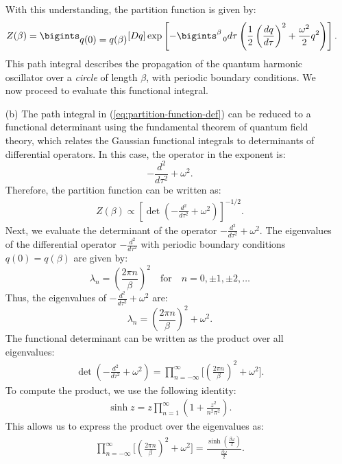\begin{enumerate}
    With this understanding, the partition function is given by:
    \begin{align}
        Z(\beta) = \bigints_{\displaystyle q(0) = q(\beta)} [Dq] \exp \left[ -\bigints_{~~0}^{\beta} d\tau \left( \frac{1}{2} \left( \frac{dq}{d\tau} \right)^2 + \frac{\omega^2}{2} q^2 \right) \right].\label{eq:partition-function-def}
    \end{align}
    This path integral describes the propagation of the quantum harmonic oscillator over a \textit{circle} of length $\beta$, with periodic boundary conditions. We now proceed to evaluate this functional integral.
    \item [(b)] The path integral in (\ref{eq:partition-function-def}) can be reduced to a functional determinant using the fundamental theorem of quantum field theory, which relates the Gaussian functional integrals to determinants of differential operators. In this case, the operator in the exponent is:
    \[
    -\frac{d^2}{d\tau^2} + \omega^2.
    \]
    Therefore, the partition function can be written as:
    \begin{align}
        Z(\beta) \propto \left[ \det \left( -\frac{d^2}{d\tau^2} + \omega^2 \right) \right]^{-1/2}.\label{eq:partition-function}
    \end{align}
    Next, we evaluate the determinant of the operator $\displaystyle-\frac{d^2}{d\tau^2} + \omega^2$. The eigenvalues of the differential operator $\displaystyle-\frac{d^2}{d\tau^2}$ with periodic boundary conditions $q(0) = q(\beta)$ are given by:
    \[
    \lambda_n = \left( \frac{2\pi n}{\beta} \right)^2 \quad \text{for} \quad n = 0, \pm 1, \pm 2, \dots
    \]
    Thus, the eigenvalues of $\displaystyle-\frac{d^2}{d\tau^2} + \omega^2$ are:
    \[
    \lambda_n = \left( \frac{2\pi n}{\beta} \right)^2 + \omega^2.
    \]
    The functional determinant can be written as the product over all eigenvalues:
    \begin{align*}
        \det \left( -\frac{d^2}{d\tau^2} + \omega^2 \right) = \prod_{n=-\infty}^{\infty} \bigg[\left( \frac{2\pi n}{\beta} \right)^2 + \omega^2\bigg].
    \end{align*}
    To compute the product, we use the following identity:
    \begin{align*}
        \sinh z = z \prod_{n=1}^{\infty} \left( 1 + \frac{z^2}{n^2 \pi^2} \right).
    \end{align*}
    This allows us to express the product over the eigenvalues as:
    \begin{align*}
        \prod_{n=-\infty}^{\infty} \bigg[\left( \frac{2\pi n}{\beta} \right)^2 + \omega^2 \bigg] = \frac{\displaystyle\sinh\left(\frac{\beta\omega}{2}\right)}{\displaystyle\frac{\beta\omega}{2}}.

\end{align*}
\end{enumerate}
